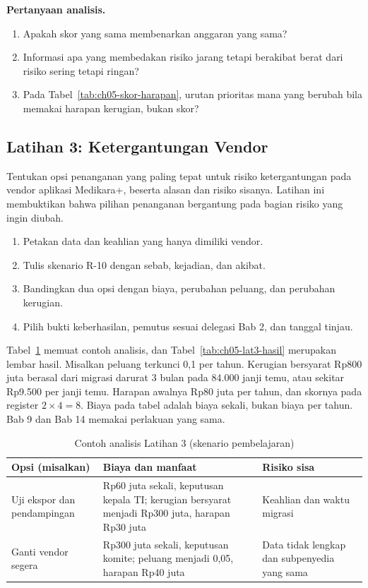 \textbf{Pertanyaan analisis.}
\begin{enumerate}
  \item Apakah skor yang sama membenarkan anggaran yang sama?
  \item Informasi apa yang membedakan risiko jarang tetapi berakibat berat dari risiko sering tetapi
  ringan?
  \item Pada Tabel~\ref{tab:ch05-skor-harapan}, urutan prioritas mana yang berubah bila memakai harapan
  kerugian, bukan skor?
\end{enumerate}

\subsection*{Latihan 3: Ketergantungan Vendor}

Tentukan opsi penanganan yang paling tepat untuk risiko ketergantungan pada vendor aplikasi
Medikara+, beserta alasan dan risiko sisanya. Latihan ini membuktikan bahwa pilihan penanganan
bergantung pada bagian risiko yang ingin diubah.

\begin{enumerate}
  \item Petakan data dan keahlian yang hanya dimiliki vendor.
  \item Tulis skenario R-10 dengan sebab, kejadian, dan akibat.
  \item Bandingkan dua opsi dengan biaya, perubahan peluang, dan perubahan kerugian.
  \item Pilih bukti keberhasilan, pemutus sesuai delegasi Bab 2, dan tanggal tinjau.
\end{enumerate}

Tabel~\ref{tab:ch05-lat3-contoh} memuat contoh analisis, dan Tabel~\ref{tab:ch05-lat3-hasil}
merupakan lembar hasil. Misalkan peluang terkunci 0,1 per tahun. Kerugian bersyarat Rp800 juta berasal
dari migrasi darurat 3 bulan pada 84.000 janji temu, atau sekitar Rp9.500 per janji temu. Harapan
awalnya Rp80 juta per tahun, dan skornya pada register $2 \times 4 = 8$. Biaya pada tabel adalah biaya
sekali, bukan biaya per tahun. Bab 9 dan Bab 14 memakai perlakuan yang sama.

\begin{table}[!htb]
  \centering\small
  \caption{Contoh analisis Latihan 3 (skenario pembelajaran)}\label{tab:ch05-lat3-contoh}
  \begin{tabularx}{\textwidth}{|>{\raggedright\arraybackslash}X|>{\raggedright\arraybackslash}X|>{\raggedright\arraybackslash}X|}
    \hline
    \textbf{Opsi (misalkan)} & \textbf{Biaya dan manfaat} & \textbf{Risiko sisa} \\ \hline
    Uji ekspor dan pendampingan & Rp60 juta sekali, keputusan kepala TI; kerugian bersyarat
    menjadi Rp300 juta, harapan Rp30 juta & Keahlian dan waktu migrasi \\ \hline
    Ganti vendor segera & Rp300 juta sekali, keputusan komite; peluang menjadi 0,05, harapan Rp40
    juta &
    Data tidak lengkap dan subpenyedia yang sama \\ \hline
  \end{tabularx}
\end{table}

